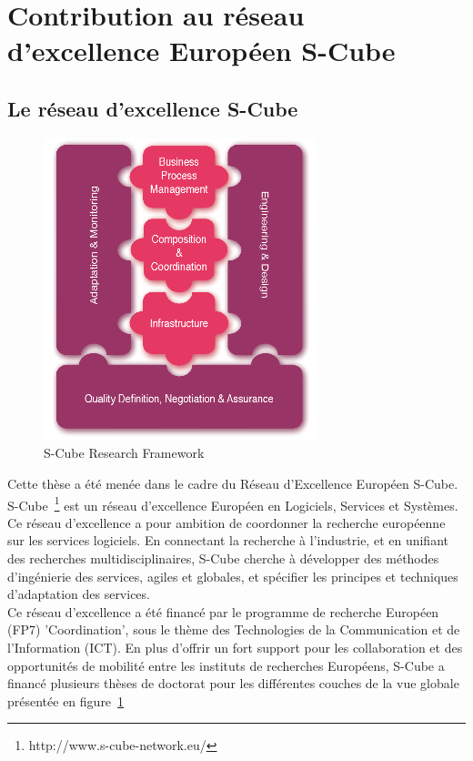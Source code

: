 \section{Contribution au réseau d'excellence Européen S-Cube}

\subsection{Le réseau d'excellence S-Cube}

\begin{figure}
  \centering
  \includegraphics[width=.5\textwidth]{part1/pics/scube-overview.png}
  \caption{S-Cube Research Framework}
  \label{fig:scube-overview}
\end{figure}


Cette thèse a été menée dans le cadre du Réseau d'Excellence Européen S-Cube.
S-Cube~\footnote{http://www.s-cube-network.eu/} est un réseau d'excellence Européen en Logiciels, Services et Systèmes. Ce réseau d'excellence a pour ambition de coordonner la recherche européenne sur les services logiciels. En connectant la recherche à l'industrie, et en unifiant des recherches multidisciplinaires, S-Cube cherche à développer des méthodes d'ingénierie des services, agiles et globales, et spécifier les principes et techniques d'adaptation des services.\\
Ce réseau d'excellence a été financé par le programme de recherche Européen (FP7) 'Coordination', sous le thème des Technologies de la Communication et de l'Information (ICT). En plus d'offrir un fort support pour les collaboration et des opportunités de mobilité entre les instituts de recherches Européens, S-Cube a financé plusieurs thèses de doctorat pour les différentes couches de la vue globale présentée en figure~\ref{fig:scube-overview}\\


